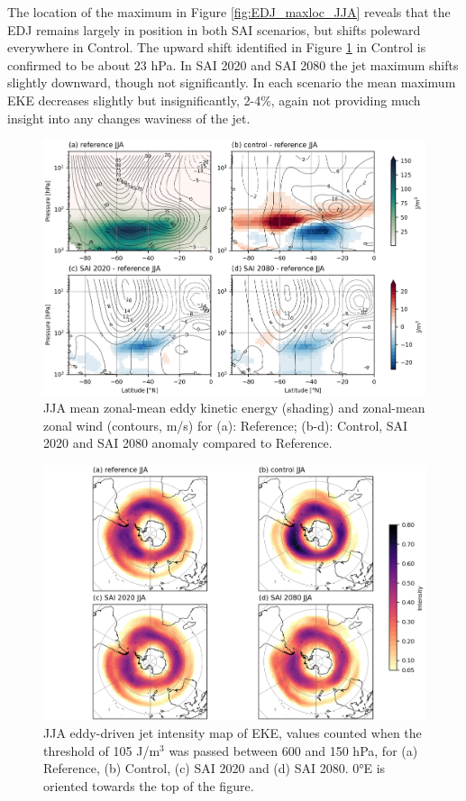 The location of the maximum in Figure \ref{fig:EDJ_maxloc_JJA} reveals that the EDJ remains largely in position in both SAI scenarios, but shifts poleward everywhere in Control. The upward shift identified in Figure \ref{fig:EKE_U_zmdiff_JJA} in Control is confirmed to be about 23 hPa. In SAI 2020 and SAI 2080 the jet maximum shifts slightly downward, though not significantly. In each scenario the mean maximum EKE decreases slightly but insignificantly, 2-4\%, again not providing much insight into any changes waviness of the jet. 

\begin{figure}[H]
	\centering
	\includegraphics[width=0.95\linewidth]{images/EKE_U_zmdiff_JJA.png}
	\caption{JJA mean zonal-mean eddy kinetic energy (shading) and zonal-mean zonal wind (contours, m/s) for (a): Reference; (b-d): Control, SAI 2020 and SAI 2080 anomaly compared to Reference.}
	\label{fig:EKE_U_zmdiff_JJA}
\end{figure}

\begin{figure}[H]
	\centering
	\includegraphics[width=0.95\linewidth]{images/EDJ_map_JJA.png}
	\caption{JJA eddy-driven jet intensity map of EKE, values counted when the threshold of 105 J/m$^3$ was passed between 600 and 150 hPa, for (a) Reference, (b) Control, (c) SAI 2020 and (d) SAI 2080. 0°E is oriented towards the top of the figure.}
	\label{fig:EDJ_map_JJA}
\end{figure}

